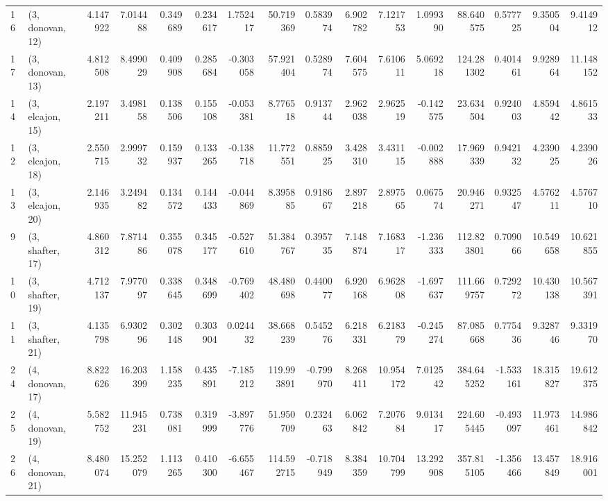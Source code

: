 \begin{tabular}{llrrrrrrrrrrrrrr}
16 &  (3, donovan, 12) &  4.147922 &   7.014488 &   0.349689 &  0.234617 &  1.752417 &   50.719369 &  0.583974 &   6.902782 &   7.121753 &   1.099390 &   88.640575 &  0.577725 &   9.350504 &   9.414912 \\
17 &  (3, donovan, 13) &  4.812508 &   8.499029 &   0.409908 &  0.285684 & -0.303058 &   57.921404 &  0.528974 &   7.604575 &   7.610611 &   5.069218 &  124.281302 &  0.401461 &   9.928964 &  11.148152 \\
14 &  (3, elcajon, 15) &  2.197211 &   3.498158 &   0.138506 &  0.155108 & -0.053381 &    8.776518 &  0.913744 &   2.962038 &   2.962519 &  -0.142575 &   23.634504 &  0.924003 &   4.859442 &   4.861533 \\
12 &  (3, elcajon, 18) &  2.550715 &   2.999732 &   0.159937 &  0.133265 & -0.138718 &   11.772551 &  0.885925 &   3.428310 &   3.431115 &  -0.002888 &   17.969339 &  0.942132 &   4.239025 &   4.239026 \\
13 &  (3, elcajon, 20) &  2.146935 &   3.249482 &   0.134572 &  0.144433 & -0.044869 &    8.395885 &  0.918667 &   2.897218 &   2.897565 &   0.067574 &   20.946271 &  0.932547 &   4.576211 &   4.576710 \\
9  &  (3, shafter, 17) &  4.860312 &   7.871486 &   0.355078 &  0.345177 & -0.527610 &   51.384767 &  0.395735 &   7.148874 &   7.168317 &  -1.236333 &  112.823801 &  0.709066 &  10.549658 &  10.621855 \\
10 &  (3, shafter, 19) &  4.712137 &   7.977097 &   0.338645 &  0.348699 & -0.769402 &   48.480698 &  0.440077 &   6.920168 &   6.962808 &  -1.697637 &  111.669757 &  0.729272 &  10.430138 &  10.567391 \\
11 &  (3, shafter, 21) &  4.135798 &   6.930296 &   0.302148 &  0.303904 &  0.024432 &   38.668239 &  0.545276 &   6.218331 &   6.218379 &  -0.245274 &   87.085668 &  0.775436 &   9.328746 &   9.331970 \\
24 &  (4, donovan, 17) &  8.822626 &  16.203399 &   1.158235 &  0.435891 & -7.185212 &  119.993891 & -0.799970 &   8.268411 &  10.954172 &   7.012542 &  384.645252 & -1.533161 &  18.315827 &  19.612375 \\
25 &  (4, donovan, 19) &  5.582752 &  11.945231 &   0.738081 &  0.319999 & -3.897776 &   51.950709 &  0.232463 &   6.062842 &   7.207684 &   9.013417 &  224.605445 & -0.493097 &  11.973461 &  14.986842 \\
26 &  (4, donovan, 21) &  8.480074 &  15.252079 &   1.113265 &  0.410300 & -6.655467 &  114.592715 & -0.718949 &   8.384359 &  10.704799 &  13.292908 &  357.815105 & -1.356466 &  13.457849 &  18.916001 \\

\end{tabular}
